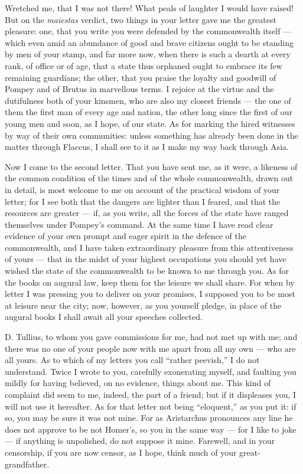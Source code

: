  Wretched me, that I was not there! What peals of laughter I would have raised! But on the \textit{maiestas} verdict, two things in your letter gave me the greatest pleasure: one, that you write you were defended by the commonwealth itself --- which even amid an abundance of good and brave citizens ought to be standing by men of your stamp, and far more now, when there is such a dearth at every rank, of office or of age, that a state thus orphaned ought to embrace its few remaining guardians; the other, that you praise the loyalty and goodwill of Pompey and of Brutus in marvellous terms. I rejoice at the virtue and the dutifulness both of your kinsmen, who are also my closest friends --- the one of them the first man of every age and nation, the other long since the first of our young men and soon, as I hope, of our state. As for marking the hired witnesses by way of their own communities: unless something has already been done in the matter through Flaccus, I shall see to it as I make my way back through Asia.

 Now I come to the second letter. That you have sent me, as it were, a likeness of the common condition of the times and of the whole commonwealth, drawn out in detail, is most welcome to me on account of the practical wisdom of your letter; for I see both that the dangers are lighter than I feared, and that the resources are greater --- if, as you write, all the forces of the state have ranged themselves under Pompey's command. At the same time I have read clear evidence of your own prompt and eager spirit in the defence of the commonwealth, and I have taken extraordinary pleasure from this attentiveness of yours --- that in the midst of your highest occupations you should yet have wished the state of the commonwealth to be known to me through you. As for the books on augural law, keep them for the leisure we shall share. For when by letter I was pressing you to deliver on your promises, I supposed you to be most at leisure near the city; now, however, as you yourself pledge, in place of the augural books I shall await all your speeches collected.

 D. Tullius, to whom you gave commissions for me, had not met up with me; and there was no one of your people now with me apart from all my own --- who are all yours. As to which of my letters you call ``rather peevish,'' I do not understand. Twice I wrote to you, carefully exonerating myself, and faulting you mildly for having believed, on no evidence, things about me. This kind of complaint did seem to me, indeed, the part of a friend; but if it displeases you, I will not use it hereafter. As for that letter not being ``eloquent,'' as you put it: if so, you may be sure it was not mine. For as Aristarchus pronounces any line he does not approve to be not Homer's, so you in the same way --- for I like to joke --- if anything is unpolished, do not suppose it mine. Farewell, and in your censorship, if you are now censor, as I hope, think much of your great-grandfather.
